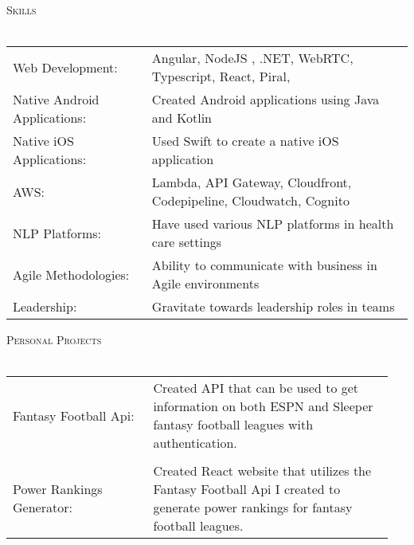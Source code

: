 \documentclass[a4paper]{article}
\newcommand{\lineunder} {
    \vspace*{-8pt} \\
    \hspace*{-18pt} \hrulefill \\
}
\newcommand{\header} [1] {
    {\hspace*{-18pt}\vspace*{6pt} \textsc{#1}}
    \vspace*{-6pt} \lineunder
}
\begin{document}
\header{Skills}
\begin{tabular}{ l l }
	Web Development:                    & Angular, NodeJS , .NET, WebRTC, Typescript, React, Piral, 
\\
	Native Android Applications:        & Created Android applications using Java and Kotlin                                                                                                \\
	Native iOS Applications:            & Used Swift to create a native iOS application                                                                                                     \\
	AWS:                                & Lambda, API Gateway, Cloudfront, Codepipeline, Cloudwatch, Cognito                                                          \\
	NLP Platforms:                      & Have used various NLP platforms in health care settings 
\\
	Agile Methodologies: 				& Ability to communicate with business in Agile environments
\\
	Leadership:                         & Gravitate towards leadership roles in teams 
\\
\end{tabular}
\vspace{2mm}

\header{Personal Projects}
\begin{tabular}{p{0.35\linewidth}  p{0.6\linewidth}}
    Fantasy Football Api:       & Created API that can be used to get information on both ESPN and Sleeper fantasy football leagues with authentication.
    \\  \\
     Power Rankings Generator:   & Created React website that utilizes the Fantasy Football Api I created to generate power rankings for fantasy football leagues.
    \\
\end{tabular}
\ 
\end{document}
